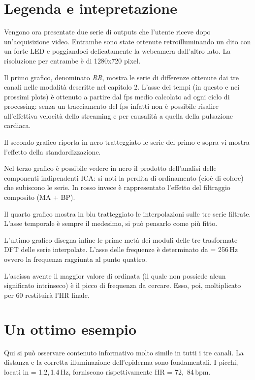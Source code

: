 \section{Legenda e intepretazione}
Vengono ora presentate due serie di outputs che l'utente riceve dopo un'acquisizione video.
Entrambe sono state ottenute retroilluminando un dito con un forte LED e poggiandoci delicatamente la webcamera dall'altro lato. La risoluzione per entrambe è di 1280x720 pixel.

Il primo grafico, denominato {\em RR}, mostra le serie di differenze ottenute dai tre canali nelle modalità descritte nel capitolo 2. L'asse dei tempi (in questo e nei prossimi plots) è ottenuto a partire dal fps medio calcolato ad ogni ciclo di processing: senza un tracciamento del fps infatti non è possibile risalire all'effettiva velocità dello streaming e per causalità a quella della pulsazione cardiaca.

Il secondo grafico riporta in nero tratteggiato le serie del primo e sopra vi mostra l'effetto della standardizzazione.

Nel terzo grafico è possibile vedere in nero il prodotto dell'analisi delle componenti indipendenti ICA: si noti la perdita di ordinamento (cioè di colore) che subiscono le serie. In rosso invece è rappresentato l'effetto del filtraggio composito (MA + BP).

Il quarto grafico mostra in blu tratteggiato le interpolazioni sulle tre serie filtrate. L'asse temporale è sempre il medesimo, si può pensarlo come più fitto.

L'ultimo grafico disegna infine le prime metà dei moduli delle tre trasformate DFT delle serie interpolate. L'asse delle frequenze è determinato da  = 256\,Hz ovvero la frequenza raggiunta al punto quattro.

L'ascissa avente il maggior valore di ordinata (il quale non possiede alcun significato intrinseco) è il picco di frequenza da cercare. Esso, poi, moltiplicato per 60 restituirà l'HR finale.

\section{Un ottimo esempio}
Qui si può osservare contenuto informativo molto simile in tutti i tre canali. La distanza e la corretta illuminazione dell'epiderma sono fondamentali.
I picchi, locati in  = 1.2,\,1.4\,Hz, forniscono rispettivamente HR = 72,\, 84\,bpm. 

